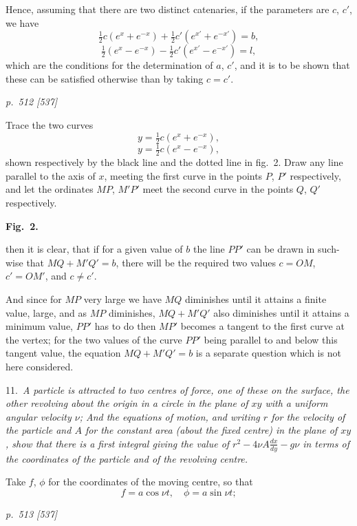 \documentclass[11pt,a4paper]{book}
\begin{document}
Hence, assuming that there are two distinct catenaries, if the parameters are $c$, $c'$, we
have
\[
\tfrac{1}{2}c(e^x + e^{-x}) + \tfrac{1}{2}c'(e^{x'} + e^{-x'}) = b,
\]
\[
\tfrac{1}{2}(e^x - e^{-x}) - \tfrac{1}{2}c'(e^{x'} - e^{-x'}) = l,
\]
which are the conditions for the determination of $a$, $c'$, and it is to be shown that
these can be satisfied otherwise than by taking $c = c'$.

\clearpage

\bigskip
\textit{p.~512 [537]}
\smallskip

\noindent
Trace the two curves
\[
y = \tfrac{1}{2}c(e^x + e^{-x}),
\]
\[
y = \tfrac{1}{2}c(e^x - e^{-x}),
\]
shown respectively by the black line and the dotted line in fig.\ 2. Draw any line
parallel to the axis of $x$, meeting the first curve in the points $P$, $P'$ respectively,
and let the ordinates $MP$, $M'P'$ meet the second curve in the points $Q$, $Q'$ respectively.

\smallskip
\textbf{Fig.\ 2.}
\smallskip

then it is clear, that if for a given value of $b$ the line $PP'$ can be drawn in such-
wise that $MQ + M'Q' = b$, there will be the required two values $c = OM$, $c' = OM'$,
and $c \neq c'$.

And since for $MP$ very large we have $MQ$ diminishes until it attains a finite value,
large, and as $MP$ diminishes, $MQ + M'Q'$ also diminishes until it attains a minimum
value, $PP'$ has to do then $MP'$ becomes a tangent to the first curve at the
vertex; for the two values of the curve $PP'$ being parallel to and below this tangent
value, the equation $MQ + M'Q' = b$ is a separate question which is not here considered.

\smallskip
\noindent\textsc{11.}\, \textit{A particle is attracted to two centres of force, one of these on the surface, the
other revolving about the origin in a circle in the plane of $xy$ with a uniform angular
velocity $\nu$; And the equations of motion, and writing $r$ for the velocity of the particle
and $A$ for the constant area (about the fixed centre) in the plane of $xy$, show that
there is a first integral giving the value of $r^2 - 4\nu A\frac{dx}{dy} - g\nu$ in terms of the coordinates of
the particle and of the revolving centre.}

Take $f$, $\phi$ for the coordinates of the moving centre, so that
\[
f = a\cos\nu t, \quad \phi = a\sin\nu t;
\]

\clearpage

\bigskip
\textit{p.~513 [537]}
\smallskip
\end{document}
